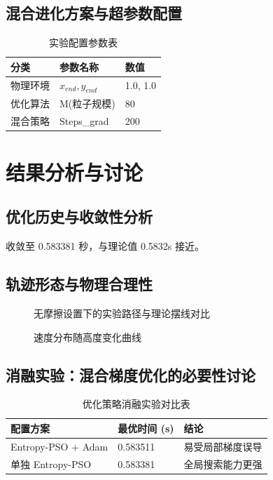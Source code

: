 \documentclass[twocolumn, UTF8, a4paper]{ctexart}
\newcommand{\xiaosi}{\fontsize{12pt}{15pt}\selectfont}
\begin{document}
	\subsection{混合进化方案与超参数配置}
	\begin{table}[h]
		\caption{实验配置参数表}
		\xiaosi
		\begin{tabular}{lll}
			\toprule
			分类 & 参数名称 & 数值 \\
			\midrule
			物理环境 & $x_{end}, y_{end}$ & 1.0, 1.0 \\
			优化算法 & M(粒子规模) & 80 \\
			混合策略 & Steps\_grad & 200 \\
			\bottomrule
		\end{tabular}
	\end{table}
	
	\section{结果分析与讨论}
	
	\subsection{优化历史与收敛性分析}
	收敛至 0.583381 秒，与理论值 0.5832s 接近。
	
	\subsection{轨迹形态与物理合理性}
	\begin{figure}[h]
		\centering
		\caption{无摩擦设置下的实验路径与理论摆线对比}
	\end{figure}
	
	\begin{figure}[h]
		\centering
		\caption{速度分布随高度变化曲线}
	\end{figure}
	
	\subsection{消融实验：混合梯度优化的必要性讨论}
	\begin{table}[h]
		\caption{优化策略消融实验对比表}
		\xiaosi
		\begin{tabular}{lll}
			\toprule
			配置方案 & 最优时间 (s) & 结论 \\
			\midrule
			Entropy-PSO + Adam & 0.583511 & 易受局部梯度误导 \\
			单独 Entropy-PSO & 0.583381 & 全局搜索能力更强 \\
			\bottomrule
		\end{tabular}
	\end{table}
	
\end{document}
